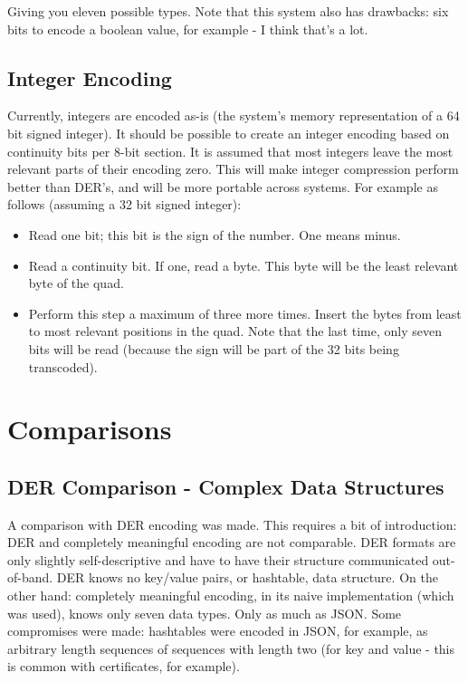 Giving you eleven possible types.
Note that this system also has drawbacks:
six bits to encode a boolean value, for example - I think that's a lot.



\subsection{Integer Encoding}

Currently, integers are encoded as-is (the system's memory representation
of a 64 bit signed integer).
It should be possible to
create an integer encoding based on continuity bits per 8-bit section.
It is assumed
that most integers leave the most relevant parts of their encoding zero.
This will make integer compression perform better
than DER's, and will be more portable across systems.
For example as follows (assuming a 32 bit signed integer):

\begin{itemize}
\item Read one bit; this bit is the sign of the number. One means minus.
\item Read a continuity bit. If one, read a byte. This byte will be the
      least relevant byte of the quad.
\item Perform this step a maximum of three more times. Insert the bytes
      from least to most relevant positions in the quad. Note that the
      last time, only seven bits will be read (because the sign will be
      part of the 32 bits being transcoded).
\end{itemize}

%

\section{Comparisons}

\subsection{DER Comparison - Complex Data Structures}

A comparison with DER encoding was made. This requires a bit of
introduction: DER and completely meaningful encoding
are not comparable. DER formats
are only slightly self-descriptive and have to have their structure
communicated
out-of-band. DER knows no key/value pairs, or hashtable, data structure.
On the other hand: completely meaningful encoding, in its naive
implementation (which was used), knows only seven data types.
Only as much as JSON. Some compromises were made: hashtables were
encoded in JSON, for example, as arbitrary length sequences of
sequences with length two (for key and value - this is common with
certificates, for example).


